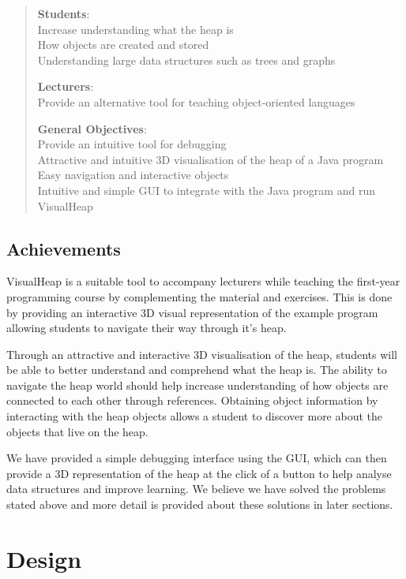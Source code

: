 \documentclass[11pt, a4paper]{report}
\begin{document}
\begin{quote}

{\bfseries Students}: \\
Increase understanding what the heap is \\
How objects are created and stored \\
Understanding large data structures such as trees and graphs

{\bfseries Lecturers}: \\
Provide an alternative tool for teaching object-oriented languages

{\bfseries General Objectives}: \\
Provide an intuitive tool for debugging \\
Attractive and intuitive 3D visualisation of the heap of a Java program \\
Easy navigation and interactive objects \\
Intuitive and simple GUI to integrate with the Java program and run VisualHeap

\end{quote}

\section{Achievements}

VisualHeap is a suitable tool to accompany lecturers while teaching the first-year programming course by complementing the material and exercises. This is done by providing an interactive 3D visual representation of the example program allowing students to navigate their way through it’s heap.

Through an attractive and interactive 3D visualisation of the heap, students will be able to better understand and comprehend what the heap is. The ability to navigate the heap world should help increase understanding of how objects are connected to each other through references. Obtaining object information by interacting with the heap objects allows a student to discover more about the objects that live on the heap.

We have provided a simple debugging interface using the GUI, which can then provide a 3D representation of the heap at the click of a button to help analyse data structures and improve learning. We believe we have solved the problems stated above and more detail is provided about these solutions in later sections.

\chapter{Design}
\end{document}
